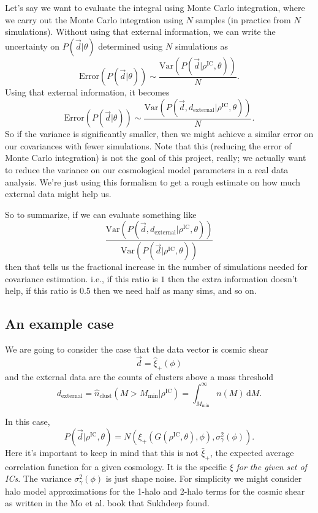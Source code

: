 \documentclass[preprint]{aastex}
\newcommand{\beq}{\begin{equation}}
\newcommand{\eeq}{\end{equation}}
\begin{document}
Let's say we want to evaluate the integral using Monte Carlo integration, where we carry out the
Monte Carlo integration using $N$ samples (in practice from $N$ simulations).  Without using that
external information, we can write the uncertainty on $P(\vec{d}|\theta)$ determined using $N$
simulations as
\beq
\text{Error}(P(\vec{d}|\theta)) \sim \frac{\text{Var}(P(\vec{d}|\rho^\text{IC},\theta))}{N}.
\eeq
Using that external information, it becomes
\beq
\text{Error}(P(\vec{d}|\theta)) \sim \frac{\text{Var}(P(\vec{d},d_\text{external}|\rho^\text{IC},\theta))}{N}.
\eeq
So if the variance is significantly smaller, then we might achieve a similar error on our
covariances with fewer simulations.  Note that this (reducing the error of Monte Carlo integration)
is not the goal of this project, really; we actually want to reduce the variance on our cosmological
model parameters in a real data analysis.  We're just using this formalism to get a rough estimate
on how much external data might help us.

So to summarize, if we can evaluate something like
\beq
\frac{\text{Var}(P(\vec{d},d_\text{external}|\rho^\text{IC},\theta))}{\text{Var}(P(\vec{d}|\rho^\text{IC},\theta))}
\eeq
then that tells us the fractional increase in the number of simulations needed for covariance
estimation.  i.e., if this ratio is $1$ then the extra information doesn't help, if this ratio is
$0.5$ then we need half as many sims, and so on.

\subsection{An example case}

We are going to consider the case that the data vector is cosmic shear
\beq
\vec{d} = \hat{\xi}_+(\phi)
\eeq
and the external data are the counts of clusters above a mass threshold
\beq
d_\text{external} = \hat{n}_\text{clust}(M>M_\text{min} | \rho^\text{IC}) =
\int_{M_\text{min}}^{\infty} n(M)\,\mathrm{d}M.
\eeq

In this case,
\beq
P(\vec{d}|\rho^\text{IC},\theta) = N(\xi_+(G(\rho^\text{IC},\theta), \phi), \sigma^2_\gamma(\phi)).
\eeq
Here it's important to keep in mind that this is not $\bar{\xi}_+$, the expected average correlation
function for a given cosmology.  It is the specific $\xi$ {\em for the given set of ICs}. The
variance $\sigma^2_\gamma(\phi)$ is just shape noise.  For simplicity we might consider halo model
approximations for the 1-halo and 2-halo terms for the cosmic shear as written in the Mo et al. book
that Sukhdeep found.  
\end{document}
